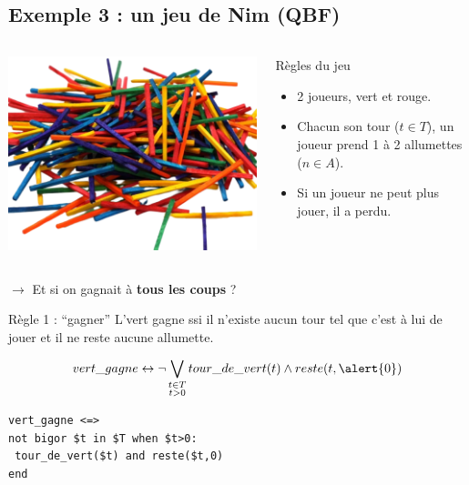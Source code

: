 \documentclass[english,french,usenames,dvipsnames]{beamer}
\begin{document}
\subsection{Exemple 3 : un jeu de Nim (QBF)}

\begin{frame}{\subsecname}
\begin{columns}[T]
\begin{column}{0.3\textwidth}
\includegraphics[width=1\textwidth]{figures/allumettes.png}
\end{column}
\begin{column}{0.7\textwidth}
\begin{exampleblock}{Règles du jeu}
\begin{itemize}
\item 2 joueurs, {\color{ForestGreen}vert} et {\color{red}rouge}.
\item Chacun son tour ($t \in T$), un joueur prend 1 à 2 allumettes ($n \in A$).
\item Si un joueur ne peut plus jouer, il a perdu.
\end{itemize}
\end{exampleblock}
\end{column}
\end{columns}
\begin{center}
$\longrightarrow$ Et si on gagnait à \textbf{tous les coups} ?    
\end{center}
\end{frame}

\begin{frame}[containsverbatim]{\subsecname}
\begin{exampleblock}{Règle 1 : \enquote{gagner}}
L'{\color{ForestGreen}vert} gagne ssi il n'existe aucun tour tel que c'est à lui de jouer et il ne reste aucune allumette.
\end{exampleblock}
\[
vert\_gagne \leftrightarrow \neg \bigvee_{\substack{t \in T\\t > 0}}
tour\_de\_vert(t) \wedge reste(t,\alert{0})
\]
\begin{verbatim}
vert_gagne <=>
not bigor $t in $T when $t>0:
 tour_de_vert($t) and reste($t,0)
end
\end{verbatim}
\end{frame}
\end{document}
